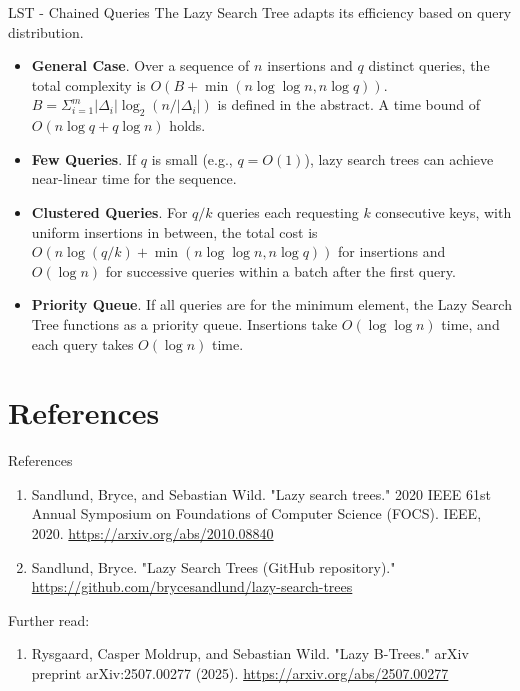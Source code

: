 \documentclass[aspectratio=169,xcolor=dvipsnames]{beamer}
\begin{document}
\begin{frame}{LST - Chained Queries}
The Lazy Search Tree adapts its efficiency based on query distribution.

\begin{itemize}
    \item \textbf{General Case}. Over a sequence of $n$ insertions and $q$ distinct queries, the total complexity is $O(B + \min(n \log \log n, n \log q))$. $B = \Sigma_{i=1}^{m} |\Delta_i| \log_2(n/|\Delta_i|)$ is defined in the abstract. A time bound of $O(n \log q + q \log n)$ holds.
    \item \textbf{Few Queries}. If $q$ is small (e.g., $q=O(1)$), lazy search trees can achieve near-linear time for the sequence.
    \item \textbf{Clustered Queries}. For $q/k$ queries each requesting $k$ consecutive keys, with uniform insertions in between, the total cost is $O(n \log(q/k) + \min(n \log \log n, n \log q))$ for insertions and $O(\log n)$ for successive queries within a batch after the first query.
    \item \textbf{Priority Queue}. If all queries are for the minimum element, the Lazy Search Tree functions as a priority queue. Insertions take $O(\log \log n)$ time, and each query takes $O(\log n)$ time.
\end{itemize}
\end{frame}


\section{References}
\begin{frame}{References}
    \begin{enumerate}
        \item Sandlund, Bryce, and Sebastian Wild. "Lazy search trees." 2020 IEEE 61st Annual Symposium on Foundations of Computer Science (FOCS). IEEE, 2020. \url{https://arxiv.org/abs/2010.08840}
        \item Sandlund, Bryce. "Lazy Search Trees (GitHub repository)." \url{https://github.com/brycesandlund/lazy-search-trees}
    \end{enumerate}
    Further read: 
    \begin{enumerate}
        \item Rysgaard, Casper Moldrup, and Sebastian Wild. "Lazy B-Trees." arXiv preprint arXiv:2507.00277 (2025). \url{https://arxiv.org/abs/2507.00277}
    \end{enumerate}
\end{frame}

\end{document}

